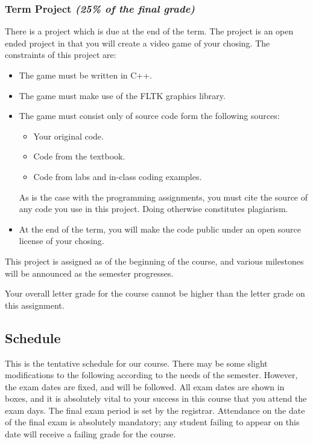 \documentclass[11pt]{article}
\begin{document}
\subsubsection*{Term Project {\em (25\% of the final grade)}}
There is a project which is due at the end of the term.  The project
is an open ended project in that you will create a video game of your
chosing.  The constraints of this project are:
\begin{itemize}
    \item The game must be written in C++.
    \item The game must make use of the FLTK graphics library.
    \item The game must consist only of source code form the following
        sources:
        \begin{itemize}
            \item Your original code.
            \item Code from the textbook.
            \item Code from labs and in-class coding examples.
        \end{itemize}
        As is the case with the programming assignments, you must cite
        the source of any code you use in this project. Doing
        otherwise constitutes plagiarism.

    \item At the end of the term, you will make the code public under
        an open source license of your chosing.
\end{itemize}
This project is assigned as of the beginning of the course, and
various milestones will be announced as the semester progresses. 

Your overall letter grade for the course cannot be higher than the letter
grade on this assignment.




\subsection*{Schedule}
This is the tentative schedule for our course.  There may be some
slight modifications to the following according to the needs of the
semester. However, the exam dates are fixed, and will be followed.
All exam dates are shown in boxes, and it is absolutely vital to
your success in this course that you attend the exam days.  The final
exam period is set by the registrar.  Attendance on the date of the
final exam is absolutely mandatory; any student failing to appear on
this date will receive a failing grade for the course.
\end{document}
